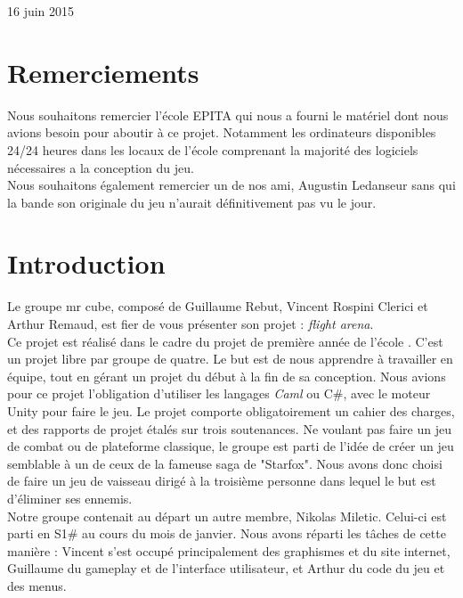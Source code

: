 \documentclass[12pt, titlepage]{article}
\begin{document}
\begin{spacing}{1.5}
\begin{titlepage}
\begin{center}
\vfill{16 juin 2015}
\end{center}
\end{titlepage}

\section*{Remerciements}
Nous souhaitons remercier l'école EPITA qui nous a fourni le matériel dont nous avions besoin pour aboutir à ce projet. Notamment les ordinateurs disponibles 24/24 heures dans les locaux de l'école comprenant la majorité des logiciels nécessaires a la conception du jeu.\\

Nous souhaitons également remercier un de nos ami, Augustin Ledanseur sans qui la bande son originale du jeu n'aurait définitivement pas vu le jour. \\

\newpage

\renewcommand{\contentsname}{Sommaire}
\renewcommand{\chaptername}{Partie}

\tableofcontents
{}


\newpage
\section*{Introduction}
Le groupe mr cube, composé de Guillaume Rebut, Vincent Rospini Clerici et Arthur Remaud, est fier de vous présenter son projet : \textit{flight arena}.\\

Ce projet est réalisé dans le cadre  du projet de première année de l'école . C’est un projet libre par groupe de quatre. Le but est de nous apprendre à travailler en équipe, tout en gérant un projet du début à la fin de sa conception. Nous avions pour ce projet l'obligation d'utiliser les langages \textit{Caml} ou {C\#}, avec le moteur Unity pour faire le jeu. Le projet comporte obligatoirement un cahier des charges, et des rapports de projet étalés sur trois soutenances. Ne voulant pas faire un jeu de combat ou de plateforme classique, le groupe est parti de l’idée de créer un jeu semblable à un de ceux de la fameuse saga de "Starfox". Nous avons donc choisi de faire un jeu de vaisseau dirigé à la troisième personne dans lequel le but est d'éliminer ses ennemis.\\

Notre groupe contenait au départ un autre membre, Nikolas Miletic. Celui-ci est parti en S1\# au cours du mois de janvier. Nous avons réparti les tâches de cette manière : Vincent s'est occupé principalement des graphismes et du site internet, Guillaume du gameplay et de l’interface utilisateur, et Arthur du code du jeu et des menus.\\


\end{spacing}
\end{document}
